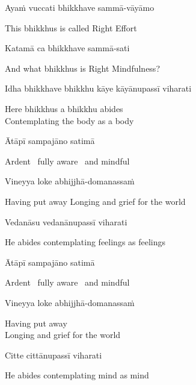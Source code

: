 Ayaṁ vuccati bhikkhave sammā-vāyāmo

\begin{cprenglish}
  This bhikkhus is called Right Effort
\end{cprenglish}

Katamā ca bhikkhave sammā-sati

\begin{cprenglish}
  And what bhikkhus is Right Mindfulness?
\end{cprenglish}

Idha bhikkhave bhikkhu kāye kāyānupassī viharati

\begin{cprenglish}
  Here bhikkhus a bhikkhu abides\\
  Contemplating the body as a body
\end{cprenglish}

Ātāpī sampajāno satimā

\begin{cprenglish}
  Ardent \breathmark\ fully aware \breathmark\ and mindful
\end{cprenglish}

Vineyya loke abhijjhā-domanassaṁ

\begin{cprenglish}
  Having put away
  Longing and grief for the world
\end{cprenglish}

Vedanāsu vedanānupassī viharati

\begin{cprenglish}
  He abides contemplating feelings as feelings
\end{cprenglish}

Ātāpī sampajāno satimā

\begin{cprenglish}
  Ardent \breathmark\ fully aware \breathmark\ and mindful
\end{cprenglish}

Vineyya loke abhijjhā-domanassaṁ

\begin{cprenglish}
  Having put away\\
  Longing and grief for the world
\end{cprenglish}

Citte cittānupassī viharati

\begin{cprenglish}
  He abides contemplating mind as mind
\end{cprenglish}

